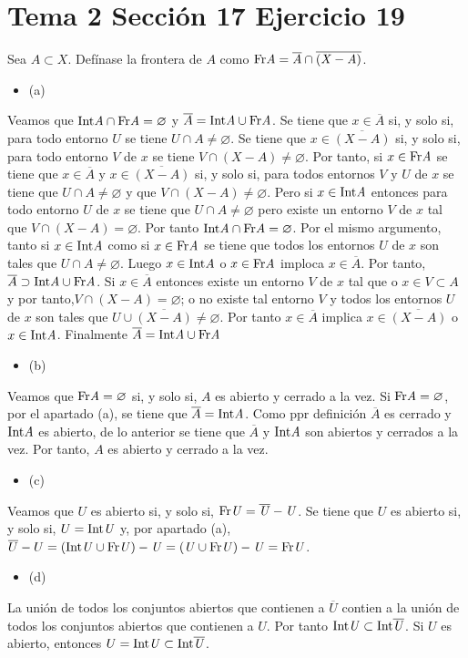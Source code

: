 \documentclass{article}
\begin{document}
\section{Tema 2 Sección 17 Ejercicio 19}
Sea $A\subset X$. Defínase la frontera de $A$ como $\rm Fr \it A= \overline{A}\cap \overline{(X-A)}$.
\begin{itemize}
\item (a)
\end{itemize}
Veamos que $\rm Int \it A\cap \rm  Fr\it A=\varnothing$ y $\overline{A}=\rm Int \it A\cup \rm Fr \it A$. Se tiene que $x\in \overline{A}$ si, y solo si, para todo entorno $U$ se tiene $U\cap A\neq \varnothing$. Se tiene que $x\in \overline{(X-A)}$ si, y solo si, para todo entorno $V$ de $x$ se tiene $V\cap (X-A)\neq \varnothing$. Por tanto, si $x\in \rm Fr \it A$ se tiene que $x\in \overline{A}$ y $x\in \overline{(X-A)}$  si, y solo si, 
 para todos entornos $V$ y $U$ de $x$ se tiene que $U\cap A\neq \varnothing$ y que $V\cap (X-A)\neq \varnothing$. Pero si $x\in \rm Int\it A$ entonces para todo entorno $U$ de $x$ se tiene que $U\cap A\neq \varnothing$ pero existe un entorno $V$ de $x$ tal que $V\cap (X-A)= \varnothing$. Por tanto $\rm Int \it A \cap \rm Fr \it A = \varnothing$. Por el mismo argumento, tanto si $x\in \rm Int \it A$ como si $x\in \rm Fr\it  A$ se tiene que todos los  entornos $U$ de $x$ son tales que $U\cap A\neq \varnothing$. Luego $x\in \rm Int \it A$ o $x\in \rm Fr\it  A$ imploca $x\in \overline{A}$. Por tanto, $\overline{A}\supset\rm Int \it A\cup \rm Fr\it  A$. Si $x\in \overline{A}$ entonces existe un entorno $V$ de $x$ tal que o $x\in V\subset A$ y por tanto,$V\cap (X-A)=\varnothing$; o no existe tal entorno $V$ y todos los entornos $U$ de $x$ son tales que $U\cup \overline{(X-A)}\neq\varnothing$. Por tanto $x\in \overline {A}$ implica $x\in \overline {(X-A)}$ o $x\in \rm Int\it A$. Finalmente $\overline{A}=\rm Int\it A\cup \rm Fr \it A$
\begin{itemize}
\item (b)
\end{itemize}
Veamos que $\rm Fr\it A=\varnothing$ si, y solo si, $A$ es abierto y cerrado a la vez. Si  
$\rm Fr\it A=\varnothing$, por el apartado (a), se tiene que $\overline{A}=\rm Int\it A$. Como ppr definición $\overline{A}$ es cerrado y $\rm Int\it A$ es abierto, de lo anterior se tiene que $\overline{A}$ y $\rm Int\it A$ son abiertos y cerrados a la vez. Por tanto, $A$ es abierto y cerrado a la vez.
\begin{itemize}
\item (c)
\end{itemize}
Veamos que $U$ es abierto si, y solo si, $\rm Fr\it U=\overline{U}-U$. Se tiene que $U$ es abierto si, y solo si, $U=\rm Int\it U$ y, por apartado (a), $\overline{U}-U=(\rm Int \it U \cup \rm Fr\it U)-U=(U\cup\rm Fr\it U)-U=\rm Fr\it U$.
\begin{itemize}
\item (d)
\end{itemize}
La unión de todos los conjuntos abiertos que contienen a $\overline{U}$ contien a la unión de todos los conjuntos abiertos que contienen a $U$. Por tanto $\rm Int \it U \subset \rm Int \it \overline{U}$. Si $U$ es abierto, entonces $U=\rm Int \it U\subset\rm Int \it \overline{U}$.
\end{document}
